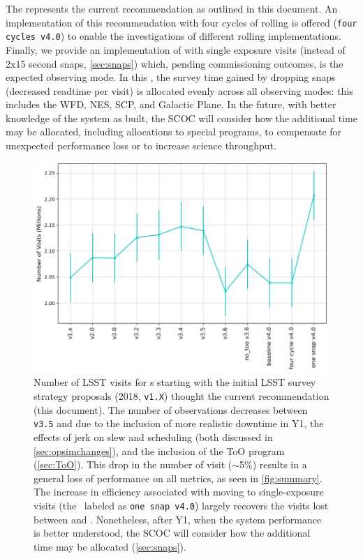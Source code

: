  The  represents the current recommendation as outlined in this document. An implementation of this recommendation with four cycles of rolling is offered (\texttt{four cycles v4.0}) to enable the investigations of different rolling implementations. Finally, we provide an implementation of  with single exposure visits (instead of 2x15 second snaps, \autoref{sec:snaps}) which, pending commissioning outcomes, is the expected observing mode. In this \opsim, the survey time gained by dropping snaps (decreased readtime per visit) is allocated evenly across all observing modes: this includes the WFD, NES, SCP, and Galactic Plane. In the future, with better knowledge of the system as built, the SCOC will consider how the additional time may be allocated, including allocations to special programs,  to compensate for unexpected performance loss or to increase science throughput.
\begin{figure}
    \centering
    \includegraphics[width=0.9\linewidth]{figures/total_nvisits.png}
    \caption{Number of LSST visits for \opsim s starting with the initial LSST survey strategy proposals (2018, \texttt{v1.X}) thought the current recommendation (this document). The number of observations decreases between \texttt{v3.5} and  due to the inclusion of more realistic downtime in Y1, the effects of jerk on slew and scheduling (both discussed in \autoref{sec:opsimchanges}), and the inclusion of the ToO program (\autoref{sec:ToO}). This drop in the number of visit (\mbox{$\sim$5\%}) results in a general loss of performance on all metrics, as seen in \autoref{fig:summary}. The increase in efficiency associated with moving to single-exposure visits (the \opsim\ labeled as \texttt{one snap v4.0}) largely recovers the visits lost between  and . Nonetheless, after Y1, when the system performance is better understood, the SCOC will consider how the additional time may be allocated (\autoref{sec:snaps}). }
    \label{fig:nvisits}
\end{figure}

